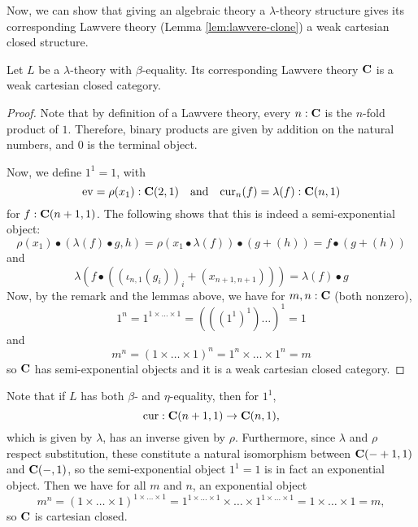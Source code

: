 Now, we can show that giving an algebraic theory a $ \lambda $-theory structure gives its corresponding Lawvere theory (Lemma \ref{lem:lawvere-clone}) a weak cartesian closed structure.
\begin{lemma}
  Let $ L $ be a $ \lambda $-theory with $ \beta $-equality. Its corresponding Lawvere theory $ \mathbf{C} $ is a weak cartesian closed category.
\end{lemma}
\begin{proof}
  Note that by definition of a Lawvere theory, every $ n: \mathbf{C} $ is the $ n $-fold product of $ 1 $. Therefore, binary products are given by addition on the natural numbers, and $ 0 $ is the terminal object.

  Now, we define $ 1^1 = 1 $, with
  \[ \mathrm{ev} = \rho(x_1) : \mathbf{C}(2, 1) \quad \text{and} \quad \mathrm{cur}_n(f) = \lambda(f) : \mathbf{C}(n, 1) \]
  for $ f: \mathbf{C}(n + 1, 1) $. The following shows that this is indeed a semi-exponential object:
  \[ \rho(x_1) \bullet (\lambda(f) \bullet g, h) = \rho(x_1 \bullet \lambda(f)) \bullet (g + (h)) = f \bullet (g + (h)) \]
  and
  \[ \lambda(f \bullet ((\iota_{n, 1}(g_i))_i + (x_{n + 1, n + 1}))) = \lambda(f) \bullet g \]
  Now, by the remark and the lemmas above, we have for $ m, n: \mathbf{C} $ (both nonzero),
  \[ 1^n = 1^{1 \times \dots \times 1} = (((1^1)^1)\dots)^1 = 1 \]
  and
  \[ m^n = (1 \times \dots \times 1)^n = 1^n \times \dots \times 1^n = m \]
  so $ \mathbf{C} $ has semi-exponential objects and it is a weak cartesian closed category.
\end{proof}

\begin{remark}
  Note that if $ L $ has both $ \beta $- and $ \eta $-equality, then for $ 1^1 $,
  \[ \mathrm{cur}: \mathbf{C}(n + 1, 1) \to \mathbf{C}(n, 1), \]
  which is given by $ \lambda $, has an inverse given by $ \rho $. Furthermore, since $ \lambda $ and $ \rho $ respect substitution, these constitute a natural isomorphism between $ \mathbf{C}(- + 1, 1) $ and $ \mathbf{C}(-, 1) $, so the semi-exponential object $ 1^1 = 1 $ is in fact an exponential object. Then we have for all $ m $ and $ n $, an exponential object
  \[ m^n = (1 \times \dots \times 1)^{1 \times \dots \times 1} = 1^{1 \times \dots \times 1} \times \dots \times 1^{1 \times \dots \times 1} = 1 \times \dots \times 1 = m, \]
  so $ \mathbf{C} $ is cartesian closed.
\end{remark}
